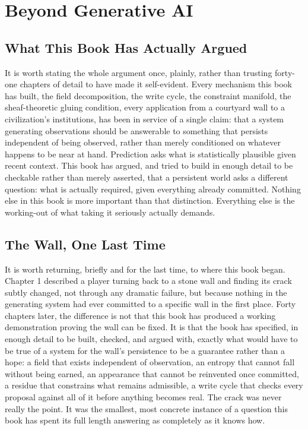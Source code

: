 \chapter{Beyond Generative AI}

\section{What This Book Has Actually Argued}

It is worth stating the whole argument once, plainly, rather than trusting forty-one chapters of detail to have made it self-evident. Every mechanism this book has built, the field decomposition, the write cycle, the constraint manifold, the sheaf-theoretic gluing condition, every application from a courtyard wall to a civilization's institutions, has been in service of a single claim: that a system generating observations should be answerable to something that persists independent of being observed, rather than merely conditioned on whatever happens to be near at hand. Prediction asks what is statistically plausible given recent context. This book has argued, and tried to build in enough detail to be checkable rather than merely asserted, that a persistent world asks a different question: what is actually required, given everything already committed. Nothing else in this book is more important than that distinction. Everything else is the working-out of what taking it seriously actually demands.

\section{The Wall, One Last Time}

It is worth returning, briefly and for the last time, to where this book began. Chapter 1 described a player turning back to a stone wall and finding its crack subtly changed, not through any dramatic failure, but because nothing in the generating system had ever committed to a specific wall in the first place. Forty chapters later, the difference is not that this book has produced a working demonstration proving the wall can be fixed. It is that the book has specified, in enough detail to be built, checked, and argued with, exactly what would have to be true of a system for the wall's persistence to be a guarantee rather than a hope: a field that exists independent of observation, an entropy that cannot fall without being earned, an appearance that cannot be reinvented once committed, a residue that constrains what remains admissible, a write cycle that checks every proposal against all of it before anything becomes real. The crack was never really the point. It was the smallest, most concrete instance of a question this book has spent its full length answering as completely as it knows how.

